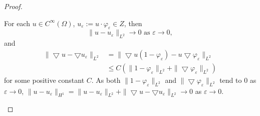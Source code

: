 \documentclass[11pt, a4paper]{amsart}
\begin{document}
\begin{proof}
\begin{enumerate}
For each $u\in C^{\infty}(\Omega)$, $u_{\varepsilon}:=u\cdot \varphi_{\varepsilon}\in Z$, then
$$\|u-u_{\varepsilon}\|_{L^2}\rightarrow 0 \mbox{ as } \varepsilon\rightarrow 0,$$ and 
\begin{align*}
\|\bigtriangledown u-\bigtriangledown u_{\varepsilon}\|_{L^2}&=\| \bigtriangledown u (1-\varphi_{\varepsilon})-u\bigtriangledown \varphi_{\varepsilon}\|_{L^2}\\
{}&\leq C(\|1-\varphi_{\varepsilon}\|_{L^2}+\|\bigtriangledown \varphi_{\varepsilon}\|_{L^2})
\end{align*}
for some positive constant $C$. As both $\|1-\varphi_{\varepsilon}\|_{L^2}$ and $\|\bigtriangledown \varphi_{\varepsilon}\|_{L^2}$ tend to $0$ as $\varepsilon\rightarrow 0$, $\|u-u_{\varepsilon}\|_{H^1}=\|u-u_{\varepsilon}\|_{L^2}+\|\bigtriangledown  u-\bigtriangledown u_{\varepsilon}\|_{L^2}\to 0$ as $\varepsilon\to 0$.
\end{enumerate}
\end{proof}
\end{document}

